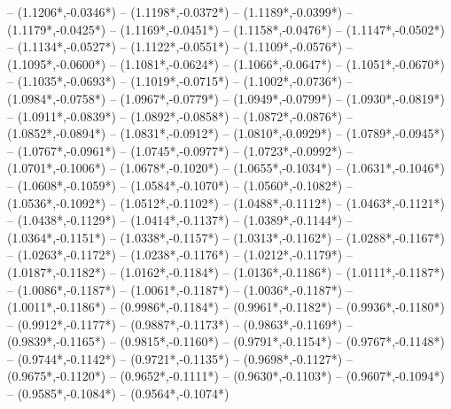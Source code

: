 {	-- ({1.1206*\dx},{-0.0346*\dy})
	-- ({1.1198*\dx},{-0.0372*\dy})
	-- ({1.1189*\dx},{-0.0399*\dy})
	-- ({1.1179*\dx},{-0.0425*\dy})
	-- ({1.1169*\dx},{-0.0451*\dy})
	-- ({1.1158*\dx},{-0.0476*\dy})
	-- ({1.1147*\dx},{-0.0502*\dy})
	-- ({1.1134*\dx},{-0.0527*\dy})
	-- ({1.1122*\dx},{-0.0551*\dy})
	-- ({1.1109*\dx},{-0.0576*\dy})
	-- ({1.1095*\dx},{-0.0600*\dy})
	-- ({1.1081*\dx},{-0.0624*\dy})
	-- ({1.1066*\dx},{-0.0647*\dy})
	-- ({1.1051*\dx},{-0.0670*\dy})
	-- ({1.1035*\dx},{-0.0693*\dy})
	-- ({1.1019*\dx},{-0.0715*\dy})
	-- ({1.1002*\dx},{-0.0736*\dy})
	-- ({1.0984*\dx},{-0.0758*\dy})
	-- ({1.0967*\dx},{-0.0779*\dy})
	-- ({1.0949*\dx},{-0.0799*\dy})
	-- ({1.0930*\dx},{-0.0819*\dy})
	-- ({1.0911*\dx},{-0.0839*\dy})
	-- ({1.0892*\dx},{-0.0858*\dy})
	-- ({1.0872*\dx},{-0.0876*\dy})
	-- ({1.0852*\dx},{-0.0894*\dy})
	-- ({1.0831*\dx},{-0.0912*\dy})
	-- ({1.0810*\dx},{-0.0929*\dy})
	-- ({1.0789*\dx},{-0.0945*\dy})
	-- ({1.0767*\dx},{-0.0961*\dy})
	-- ({1.0745*\dx},{-0.0977*\dy})
	-- ({1.0723*\dx},{-0.0992*\dy})
	-- ({1.0701*\dx},{-0.1006*\dy})
	-- ({1.0678*\dx},{-0.1020*\dy})
	-- ({1.0655*\dx},{-0.1034*\dy})
	-- ({1.0631*\dx},{-0.1046*\dy})
	-- ({1.0608*\dx},{-0.1059*\dy})
	-- ({1.0584*\dx},{-0.1070*\dy})
	-- ({1.0560*\dx},{-0.1082*\dy})
	-- ({1.0536*\dx},{-0.1092*\dy})
	-- ({1.0512*\dx},{-0.1102*\dy})
	-- ({1.0488*\dx},{-0.1112*\dy})
	-- ({1.0463*\dx},{-0.1121*\dy})
	-- ({1.0438*\dx},{-0.1129*\dy})
	-- ({1.0414*\dx},{-0.1137*\dy})
	-- ({1.0389*\dx},{-0.1144*\dy})
	-- ({1.0364*\dx},{-0.1151*\dy})
	-- ({1.0338*\dx},{-0.1157*\dy})
	-- ({1.0313*\dx},{-0.1162*\dy})
	-- ({1.0288*\dx},{-0.1167*\dy})
	-- ({1.0263*\dx},{-0.1172*\dy})
	-- ({1.0238*\dx},{-0.1176*\dy})
	-- ({1.0212*\dx},{-0.1179*\dy})
	-- ({1.0187*\dx},{-0.1182*\dy})
	-- ({1.0162*\dx},{-0.1184*\dy})
	-- ({1.0136*\dx},{-0.1186*\dy})
	-- ({1.0111*\dx},{-0.1187*\dy})
	-- ({1.0086*\dx},{-0.1187*\dy})
	-- ({1.0061*\dx},{-0.1187*\dy})
	-- ({1.0036*\dx},{-0.1187*\dy})
	-- ({1.0011*\dx},{-0.1186*\dy})
	-- ({0.9986*\dx},{-0.1184*\dy})
	-- ({0.9961*\dx},{-0.1182*\dy})
	-- ({0.9936*\dx},{-0.1180*\dy})
	-- ({0.9912*\dx},{-0.1177*\dy})
	-- ({0.9887*\dx},{-0.1173*\dy})
	-- ({0.9863*\dx},{-0.1169*\dy})
	-- ({0.9839*\dx},{-0.1165*\dy})
	-- ({0.9815*\dx},{-0.1160*\dy})
	-- ({0.9791*\dx},{-0.1154*\dy})
	-- ({0.9767*\dx},{-0.1148*\dy})
	-- ({0.9744*\dx},{-0.1142*\dy})
	-- ({0.9721*\dx},{-0.1135*\dy})
	-- ({0.9698*\dx},{-0.1127*\dy})
	-- ({0.9675*\dx},{-0.1120*\dy})
	-- ({0.9652*\dx},{-0.1111*\dy})
	-- ({0.9630*\dx},{-0.1103*\dy})
	-- ({0.9607*\dx},{-0.1094*\dy})
	-- ({0.9585*\dx},{-0.1084*\dy})
	-- ({0.9564*\dx},{-0.1074*\dy})
}
